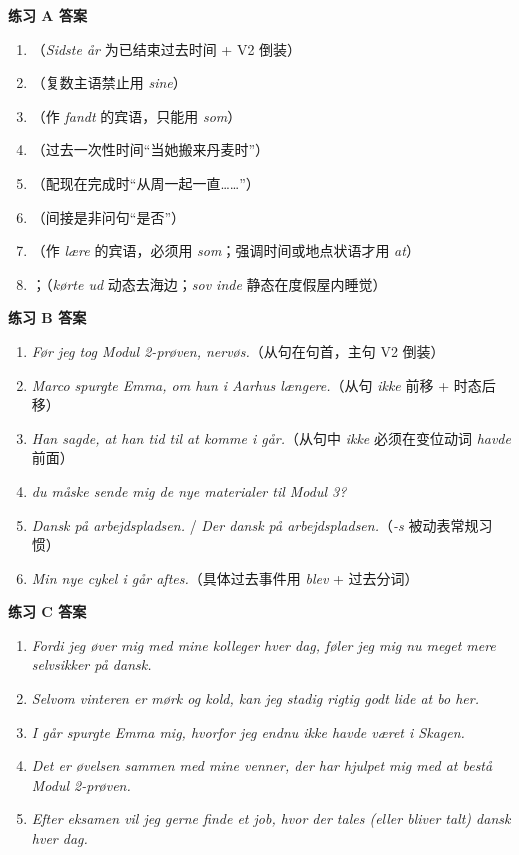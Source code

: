 \begin{answerbox}
\textbf{练习 A 答案}
\begin{enumerate}
  \item {}（\textit{Sidste år} 为已结束过去时间 + V2 倒装）
  \item {}（复数主语禁止用 \textit{sine}）
  \item {}（作 \textit{fandt} 的宾语，只能用 \textit{som}）
  \item {}（过去一次性时间“当她搬来丹麦时”）
  \item {}（配现在完成时“从周一起一直……”）
  \item {}（间接是非问句“是否”）
  \item {}（作 \textit{lære} 的宾语，必须用 \textit{som}；强调时间或地点状语才用 \textit{at}）
  \item {}；（\textit{kørte ud} 动态去海边；\textit{sov inde} 静态在度假屋内睡觉）
\end{enumerate}

\textbf{练习 B 答案}
\begin{enumerate}
  \item \textit{Før jeg tog Modul 2-prøven,  nervøs.}（从句在句首，主句 V2 倒装）
  \item \textit{Marco spurgte Emma, om hun  i Aarhus længere.}（从句 \textit{ikke} 前移 + 时态后移）
  \item \textit{Han sagde, at han  tid til at komme i går.}（从句中 \textit{ikke} 必须在变位动词 \textit{havde} 前面）
  \item \textit{ du måske sende mig de nye materialer til Modul 3?}
  \item \textit{Dansk  på arbejdspladsen.} / \textit{Der  dansk på arbejdspladsen.}（\textit{-s} 被动表常规习惯）
  \item \textit{Min nye cykel  i går aftes.}（具体过去事件用 \textit{blev} + 过去分词）
\end{enumerate}

\textbf{练习 C 答案}
\begin{enumerate}
  \item \textit{Fordi jeg øver mig med mine kolleger hver dag, føler jeg mig nu meget mere selvsikker på dansk.}
  \item \textit{Selvom vinteren er mørk og kold, kan jeg stadig rigtig godt lide at bo her.}
  \item \textit{I går spurgte Emma mig, hvorfor jeg endnu ikke havde været i Skagen.}
  \item \textit{Det er øvelsen sammen med mine venner, der har hjulpet mig med at bestå Modul 2-prøven.}
  \item \textit{Efter eksamen vil jeg gerne finde et job, hvor der tales (eller bliver talt) dansk hver dag.}
\end{enumerate}


\end{answerbox}
